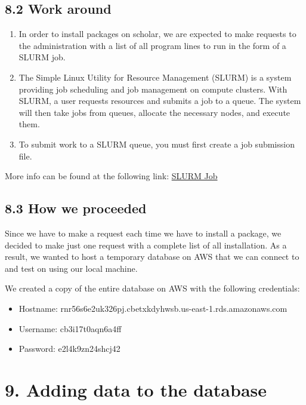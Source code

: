 \documentclass[]{book}
\providecommand{\tightlist}{%
  \setlength{\itemsep}{0pt}\setlength{\parskip}{0pt}}
\begin{document}
\subsection{8.2 Work around}\label{work-around-1}

\begin{enumerate}
\def\labelenumi{\arabic{enumi}.}
\item
  In order to install packages on scholar, we are expected to make
  requests to the administration with a list of all program lines to run
  in the form of a SLURM job.
\item
  The Simple Linux Utility for Resource Management (SLURM) is a system
  providing job scheduling and job management on compute clusters. With
  SLURM, a user requests resources and submits a job to a queue. The
  system will then take jobs from queues, allocate the necessary nodes,
  and execute them.
\item
  To submit work to a SLURM queue, you must first create a job
  submission file.
\end{enumerate}

More info can be found at the following link:
\href{https://www.rcac.purdue.edu/knowledge/weber/run/slurm}{SLURM Job}

\subsection{8.3 How we proceeded}\label{how-we-proceeded-1}

Since we have to make a request each time we have to install a package,
we decided to make just one request with a complete list of all
installation. As a result, we wanted to host a temporary database on AWS
that we can connect to and test on using our local machine.

We created a copy of the entire database on AWS with the following
credentials:

\begin{itemize}
\tightlist
\item
  Hostname: rnr56s6e2uk326pj.cbetxkdyhwsb.us-east-1.rds.amazonaws.com
\item
  Username: cb3i17t0aqn6a4ff
\item
  Password: e2l4k9zn24shcj42
\end{itemize}

\section{9. Adding data to the
database}\label{adding-data-to-the-database-1}
\end{document}
